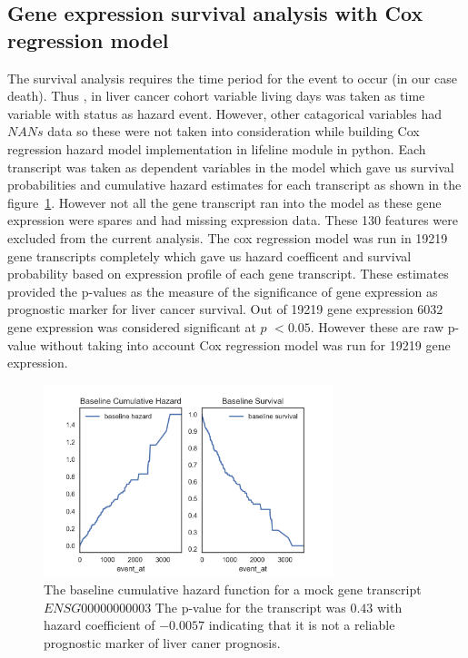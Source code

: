 \documentclass{article}
\begin{document}
	\subsection {Gene expression survival analysis with Cox regression model}
	
	The survival analysis requires the time period for the event to occur (in our case death). Thus , in liver cancer cohort variable living days was taken as time variable with status as hazard event. However, other catagorical variables had $NANs$ data so these were not taken into consideration while building Cox regression hazard model implementation in lifeline module in python. Each transcript was taken as dependent variables in the model which gave us survival probabilities and cumulative hazard estimates for each transcript as shown in the figure~\ref{fig:Baseline_hazard_and_survival}. However not all the gene transcript ran into the model as these gene expression were spares and had missing expression data. These 130 features were excluded from the current analysis.  The cox regression model was run in 19219 gene transcripts completely which gave us hazard coefficent and survival probability based on expression profile of each gene transcript. These estimates provided the p-values as the measure of the significance of gene expression as prognostic marker for  liver cancer survival. Out of 19219 gene expression $6032$ gene expression was considered significant at $p$ $< 0.05$. However these are raw p-value without taking into account Cox regression model was run for 19219 gene expression. 
	
\begin{figure}[tbh]
    \centering
      \includegraphics[width=0.75\textwidth]{survial_plot_one_mock_gene.png}
    \caption{The baseline cumulative hazard function for a mock gene transcript $ENSG00000000003$   The p-value for the transcript was $0.43$ with hazard coefficient of $-0.0057$ indicating that it is not a reliable prognostic marker of liver caner prognosis.}
    \label{fig:Baseline_hazard_and_survival}
\end{figure}
  		
\end{document}
